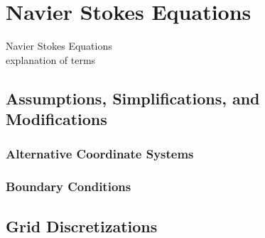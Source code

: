 \chapter{Navier Stokes Equations}\label{chapter:introduction}
Navier Stokes Equations\\
explanation of terms

\section{Assumptions, Simplifications, and Modifications}
\subsection{Alternative Coordinate Systems}
\subsection{Boundary Conditions}

\section{Grid Discretizations}

